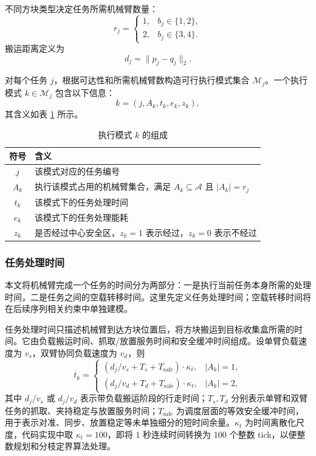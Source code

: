 不同方块类型决定任务所需机械臂数量：
\[
    r_j=
    \begin{cases}
    1, & b_j\in\{1,2\},\\
    2, & b_j\in\{3,4\}.
    \end{cases}
\]
搬运距离定义为
\[
    d_j=\|p_j-q_j\|_2.
\]

对每个任务 $j$，根据可达性和所需机械臂数构造可行执行模式集合 $\mathcal{M}_j$。一个执行模式 $k\in\mathcal{M}_j$ 包含以下信息：
\[
    k=(j,A_k,t_k,e_k,z_k),
\]
其含义如表 \ref{tab:mode_symbol} 所示。

\begin{table}[H]
    \centering
    \caption{执行模式 $k$ 的组成}
    \begin{tabular}{c >{\centering\arraybackslash}p{}}
        \toprule
        符号 & 含义 \\
        \midrule
        $j$ & 该模式对应的任务编号 \\
        $A_k$ & 执行该模式占用的机械臂集合，满足 $A_k\subseteq\mathcal{A}$ 且 $|A_k|=r_j$ \\
        $t_k$ & 该模式下的任务处理时间 \\
        $e_k$ & 该模式下的任务处理能耗 \\
        $z_k$ & 是否经过中心安全区，$z_k=1$ 表示经过，$z_k=0$ 表示不经过 \\
        \bottomrule
    \end{tabular}
    \label{tab:mode_symbol}
\end{table}

\subsubsection{任务处理时间}

本文将机械臂完成一个任务的时间分为两部分：一是执行当前任务本身所需的处理时间，二是任务之间的空载转移时间。这里先定义任务处理时间；空载转移时间将在后续序列相关约束中单独建模。

任务处理时间只描述机械臂到达方块位置后，将方块搬运到目标收集盒所需的时间。它由负载搬运时间、抓取/放置服务时间和安全缓冲时间组成。设单臂负载速度为 $v_s$，双臂协同负载速度为 $v_d$，则
\[
    t_k=
    \begin{cases}
    \left(d_j/v_s+T_s+T_{\mathrm{safe}}\right)\cdot \kappa_t, & |A_k|=1,\\
    \left(d_j/v_d+T_d+T_{\mathrm{safe}}\right)\cdot \kappa_t, & |A_k|=2,
    \end{cases}
\]
其中 $d_j/v_s$ 或 $d_j/v_d$ 表示带负载搬运阶段的行走时间；$T_s,T_d$ 分别表示单臂和双臂任务的抓取、夹持稳定与放置服务时间；$T_{\mathrm{safe}}$ 为调度层面的等效安全缓冲时间，用于表示对准、同步、放置稳定等未单独细分的短时间余量。$\kappa_t$ 为时间离散化尺度，代码实现中取 $\kappa_t=100$，即将 1 秒连续时间转换为 100 个整数 tick，以便整数规划和分枝定界算法处理。

